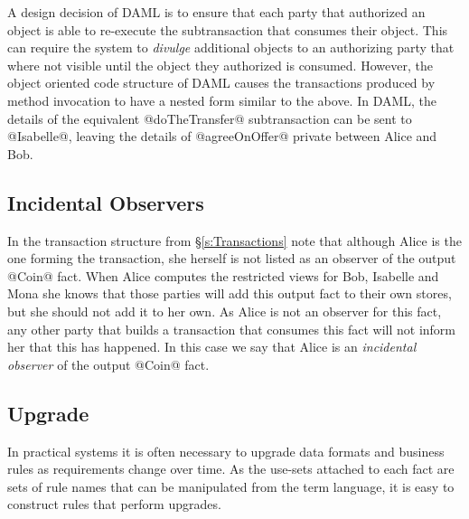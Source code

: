 A design decision of DAML is to ensure that each party that authorized an object is able to re-execute the subtransaction that consumes their object. This can require the system to \emph{divulge} additional objects to an authorizing party that where not visible until the object they authorized is consumed. However, the object oriented code structure of DAML causes the transactions produced by method invocation to have a nested form similar to the above. In DAML, the details of the equivalent @doTheTransfer@ subtransaction can be sent to @Isabelle@, leaving the details of @agreeOnOffer@ private between Alice and Bob.



\subsection{Incidental Observers}
In the transaction structure from \S\ref{s:Transactions} note that although Alice is the one forming the transaction, she herself is not listed as an observer of the output @Coin@ fact. When Alice computes the restricted views for Bob, Isabelle and Mona she knows that those parties will add this output fact to their own stores, but she should not add it to her own. As Alice is not an observer for this fact, any other party that builds a transaction that consumes this fact will not inform her that this has happened. In this case we say that Alice is an \emph{incidental observer} of the output @Coin@ fact.



\subsection{Upgrade}
\label{s:Upgrade}
In practical systems it is often necessary to upgrade data formats and business rules as requirements change over time. As the use-sets attached to each fact are sets of rule names that can be manipulated from the term language, it is easy to construct rules that perform upgrades.

